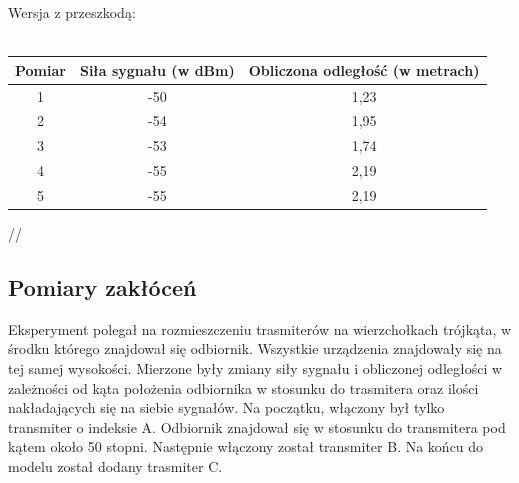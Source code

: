 \documentclass{article}
\begin{document}
\begin{itemize}
\begin{center}
		\end{center}
		\begin{center}
			\begin{minipage}{\linewidth}
				Wersja z przeszkodą:\\\\
				\begin{tabular}{|c|c|c|}
					\hline 
					Pomiar & Siła sygnału (w dBm) & Obliczona odległość (w metrach) \\ 
					\hline 
					1 & -50 & 1,23 \\ 
					\hline 
					2 & -54 & 1,95 \\ 
					\hline 
					3 & -53 & 1,74 \\ 
					\hline 
					4 & -55 & 2,19 \\ 
					\hline 
					5 & -55 & 2,19 \\ 
					\hline 
				\end{tabular}//
			\end{minipage} 
		\end{center}
		\end{itemize}
		
		\subsection{Pomiary zakłóceń}
		Eksperyment polegał na rozmieszczeniu trasmiterów na wierzchołkach trójkąta, w środku którego znajdował się odbiornik. Wszystkie urządzenia znajdowały się na tej samej wysokości. Mierzone były zmiany siły sygnału i obliczonej odległości w zależności od kąta położenia odbiornika w stosunku do trasmitera oraz ilości nakładających się na siebie sygnałów. Na początku, włączony był tylko transmiter o indeksie A. Odbiornik znajdował się w stosunku do transmitera pod kątem około 50 stopni. Następnie włączony został transmiter B. Na końcu do modelu został dodany trasmiter C.\\
		
\end{document}
